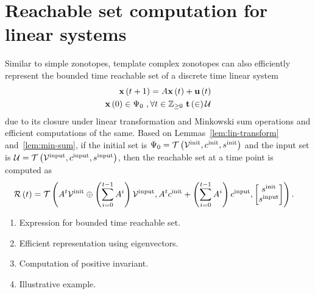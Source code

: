 \section{Reachable set computation for linear systems}

Similar to simple zonotopes, template complex zonotopes can also
efficiently represent the bounded time reachable set of a discrete
time linear system
%
\begin{align*}
{\bf x}\left(t+1\right)=A{\bf x}\left(t\right)+ {\bf u}\left(t\right)\\
{\bf x}\left(0\right)\in\Psi_0~,\forall t\in\mathbb{Z}_{\geq 0}~{\bf t}\left(\in\right)\mathcal{U}
\end{align*}
%
due to its closure under linear transformation and Minkowski sum
operations and efficient computations of the same.  Based on
Lemmas~\ref{lem:lin-transform}
and~\ref{lem:min-sum}, if the initial set is
$\Psi_0=\mathit{\mathcal{T}}\left(\mathcal{V}^{\operatorname{init}},c^{\operatorname{init}},s^{\operatorname{init}}\right)$ and the input set is
$\mathcal{U}=\mathit{\mathcal{T}}\left(\mathcal{V}^{\operatorname{input}},c^{\operatorname{input}},s^{\operatorname{input}}\right)$, then the
reachable set at a time point is computed as
%
\begin{align}
& \reachset{t}=\tcztope
{%
\minsum{A^t\inittemp}{\lt(\sum_{i=0}^{t-1}A^i\rt)\inputtemp}
}
{%
A^t\initcen+\lt(\sum_{i=0}^{t-1}A^i\rt)\inputcen
}
{%
\lt[\begin{matrix}
\initsfact \\
\inputsfact
\end{matrix}
\rt]
}.
\end{align}

{\color{red}
\begin{enumerate}
\item Expression for bounded time reachable set.
\item Efficient representation using eigenvectors.
\item Computation of positive invariant.
\item Illustrative example.
\end{enumerate}
}
